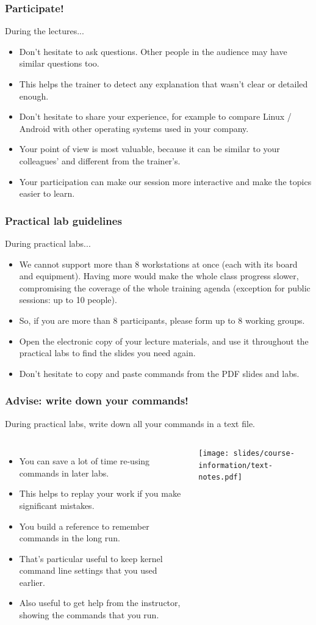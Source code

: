 \begin{frame}
\frametitle{Participate!}
During the lectures...
\begin{itemize}
\item Don't hesitate to ask questions. Other people in the audience may have
similar questions too.
\item This helps the trainer to detect any explanation that wasn't clear or
detailed enough.
\item Don't hesitate to share your experience, for example to compare Linux
/ Android with other operating systems used in your company.
\item Your point of view is most valuable, because it can be similar to your
colleagues' and different from the trainer's.
\item Your participation can make our session more interactive and make the
topics easier to learn.
\end{itemize}
\end{frame}

\begin{frame}
\frametitle{Practical lab guidelines}
During practical labs...
\begin{itemize}
\item We cannot support more than 8 workstations at once (each with its board
and equipment). Having more would make the whole class progress slower,
compromising the coverage of the whole training agenda (exception for public
sessions: up to 10 people).
\item So, if you are more than 8 participants, please form up to 8 working
groups.
\item Open the electronic copy of your lecture materials, and use it throughout
the practical labs to find the slides you need again.
\item Don't hesitate to copy and paste commands from the PDF slides and
labs.
\end{itemize}
\end{frame}

\begin{frame}
\frametitle{Advise: write down your commands!}
During practical labs, write down all your commands in a text file.
\begin{columns}
  \begin{itemize}
  \item You can save a lot of time re-using commands in later labs.
  \item This helps to replay your work if you make significant mistakes.
  \item You build a reference to remember commands in the long run.
  \item That's particular useful to keep kernel command line settings
        that you used earlier.
  \item Also useful to get help from the instructor, showing the
        commands that you run.
  \end{itemize}
  \texttt{[image: slides/course-information/text-notes.pdf]}
\end{columns}
\end{frame}

